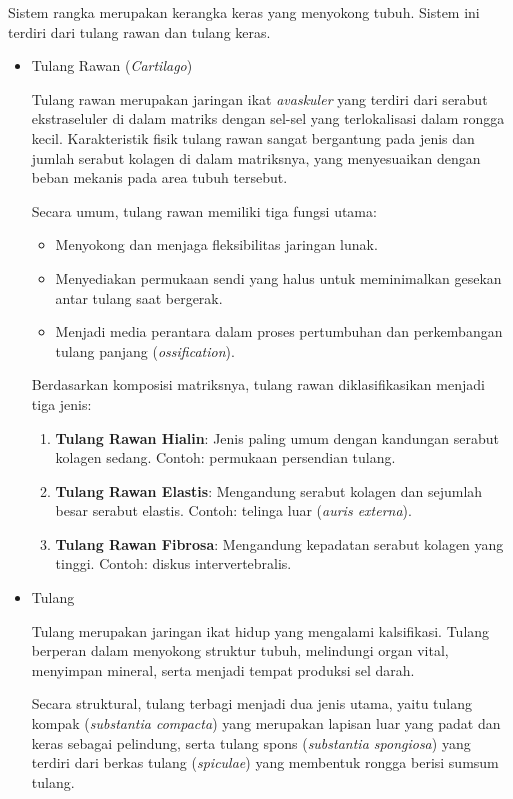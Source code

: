 Sistem rangka merupakan kerangka keras yang menyokong tubuh. Sistem ini terdiri dari tulang rawan dan tulang keras.
\begin{itemize} 
    \item {Tulang Rawan (\textit{Cartilago})}
\label{subsec:tulang_rawan}

    Tulang rawan merupakan jaringan ikat \textit{avaskuler} yang terdiri dari serabut ekstraseluler di dalam matriks dengan sel-sel yang terlokalisasi dalam rongga kecil. Karakteristik fisik tulang rawan sangat bergantung pada jenis dan jumlah serabut kolagen di dalam matriksnya, yang menyesuaikan dengan beban mekanis pada area tubuh tersebut.
    
    Secara umum, tulang rawan memiliki tiga fungsi utama:
    \begin{itemize}
        \item Menyokong dan menjaga fleksibilitas jaringan lunak.
        \item Menyediakan permukaan sendi yang halus untuk meminimalkan gesekan antar tulang saat bergerak.
        \item Menjadi media perantara dalam proses pertumbuhan dan perkembangan tulang panjang (\textit{ossification}).
    \end{itemize}
    
    Berdasarkan komposisi matriksnya, tulang rawan diklasifikasikan menjadi tiga jenis:
    \begin{enumerate}
        \item \textbf{Tulang Rawan Hialin}: Jenis paling umum dengan kandungan serabut kolagen sedang. Contoh: permukaan persendian tulang.
        \item \textbf{Tulang Rawan Elastis}: Mengandung serabut kolagen dan sejumlah besar serabut elastis. Contoh: telinga luar (\textit{auris externa}).
        \item \textbf{Tulang Rawan Fibrosa}: Mengandung kepadatan serabut kolagen yang tinggi. Contoh: diskus intervertebralis.
    \end{enumerate}
    
    \item {Tulang}
    \label{subsec:tulang}
    
    Tulang merupakan jaringan ikat hidup yang mengalami kalsifikasi. Tulang berperan dalam menyokong struktur tubuh, melindungi organ vital, menyimpan mineral, serta menjadi tempat produksi sel darah.

    
   Secara struktural, tulang terbagi menjadi dua jenis utama, yaitu tulang kompak (\textit{substantia compacta}) yang merupakan lapisan luar yang padat dan keras sebagai pelindung, serta tulang spons (\textit{substantia spongiosa}) yang terdiri dari berkas tulang (\textit{spiculae}) yang membentuk rongga berisi sumsum tulang.


\end{itemize}
